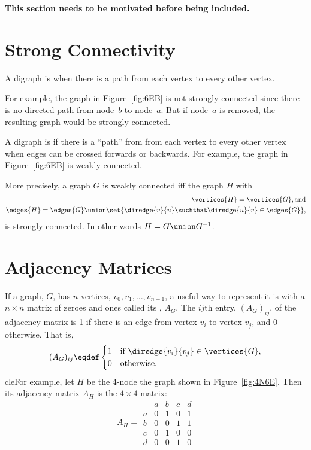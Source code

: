 \begin{editingnotes}

\textbf{This section needs to be motivated before being included.}

\section{Strong Connectivity}

\begin{definition}
A digraph is  when there is a path from each
vertex to every other vertex.
\end{definition}

For example, the graph in Figure~\ref{fig:6EB} is not strongly
connected since there is no directed path from node~$b$ to node~$a$.
But if node~$a$ is removed, the resulting graph would be strongly
connected.

A digraph is  \iffalse or, more simply,
\emph{connected})\fi if there is a ``path'' from from each vertex to
every other vertex when edges can be crossed forwards or backwards.
For example, the graph in Figure~\ref{fig:6EB} is weakly connected.

More precisely, a graph $G$ is weakly connected iff the graph $H$ with
\begin{align*}
\vertices{H} = \vertices{G}, \text{and}\\
\edges{H} = \edges{G} \union \set{\diredge{v}{u} \suchthat \diredge{u}{v} \in \edges{G}},
\end{align*}
is strongly connected.  In other words $H = G \union G^{-1}$.
\end{editingnotes}

\section{Adjacency Matrices}
If a graph, $G$, has $n$ vertices, $v_0,v_1,\dots, v_{n-1}$, a useful
way to represent it is with a $n \times n$ matrix of zeroes and ones
called its , $A_G$.  The $ij$th
entry, $(A_G)_{ij}$, of the adjacency matrix is 1 if there is an edge
from vertex $v_i$ to vertex $v_j$, and 0 otherwise.  That is,
\[
(A_G)_{ij} \eqdef \begin{cases} 1 & \text{if } \diredge{v_i}{v_j} \in
  \vertices{G},\\
0 & \text{otherwise}.
\end{cases}
\]
cleFor example, let $H$ be the 4-node the graph shown in
Figure~\ref{fig:4N6E}.  Then its adjacency matrix $A_H$ is the $4 \times
4$ matrix:
\[
A_H =\begin{array}{c|cccc|}
  &  a & b & c & d \\ \hline
a &  0 & 1 & 0 & 1 \\
b &  0 & 0 & 1 & 1 \\
c &  0 & 1 & 0 & 0 \\
d &  0 & 0 & 1 & 0
\end{array}
\]

